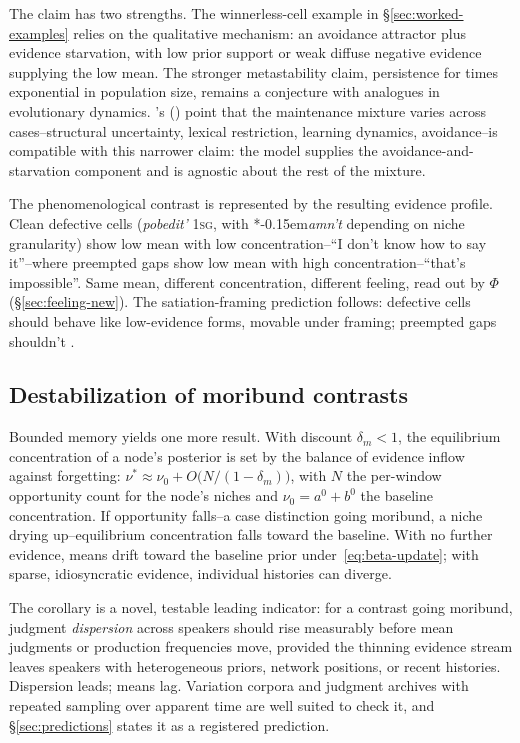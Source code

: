 \documentclass[12pt,letterpaper]{article}
\newcommand{\mention}[1]{\textit{#1}}
\newcommand{\abbr}[1]{\textsc{#1}}
\newcommand{\judgesep}{\kern-0.15em}
\newcommand{\ungram}[1]{*\judgesep#1}
\newcommand{\posscite}[1]{\citeauthor{#1}'s (\citeyear{#1})}
\begin{document}
The claim has two strengths. The winnerless-cell example in
\S\ref{sec:worked-examples} relies on the qualitative mechanism: an avoidance
attractor plus evidence starvation, with low prior support or weak diffuse
negative evidence supplying the low mean. The stronger metastability claim,
persistence for times exponential in population size, remains a conjecture with
analogues in evolutionary dynamics.
\posscite{Sims2023Defectiveness} point that the maintenance mixture varies
across cases--structural uncertainty, lexical restriction, learning dynamics,
avoidance--is compatible with this narrower claim: the model supplies the
avoidance-and-starvation component and is agnostic about the rest of the
mixture.

The phenomenological contrast is represented by the resulting evidence profile.
Clean defective cells
(\mention{pobedit'} \abbr{1sg}, with \ungram{\mention{amn't}} depending on niche
granularity) show low mean with
low concentration--\enquote{I don't know how to say it}--where preempted gaps
show low mean with high concentration--\enquote{that's impossible}. Same mean,
different concentration, different feeling, read out by $\Phi$
(\S\ref{sec:feeling-new}). The satiation-framing prediction follows: defective
cells should behave like low-evidence forms, movable under framing; preempted
gaps shouldn't \autocite{Broadbent2009Amnt,Pertsova2016RussianGaps,
ThomsEtAl2025Amnt}.

\subsection{Destabilization of moribund contrasts}
\label{sec:destabilization}

Bounded memory yields one more result. With discount $\delta_m<1$, the
equilibrium concentration of a node's posterior is set by the balance of
evidence inflow against forgetting:
$\nu^{\ast}\approx\nu_0+O\bigl(N/(1-\delta_m)\bigr)$, with $N$ the per-window
opportunity count for the node's niches and $\nu_0=a^0+b^0$ the baseline
concentration. If opportunity falls--a case distinction going moribund, a niche
drying up--equilibrium concentration falls toward the baseline. With no further
evidence, means drift toward the baseline prior under~\eqref{eq:beta-update};
with sparse, idiosyncratic evidence, individual histories can diverge.

The corollary is a novel, testable leading indicator: for a contrast going
moribund, judgment \emph{dispersion} across speakers should rise measurably
before mean judgments or production frequencies move, provided the thinning
evidence stream leaves speakers with heterogeneous priors, network positions, or
recent histories. Dispersion leads; means lag. Variation corpora and judgment
archives with repeated sampling over apparent time are well suited to check it, and
\S\ref{sec:predictions} states it as a registered prediction.
\end{document}
